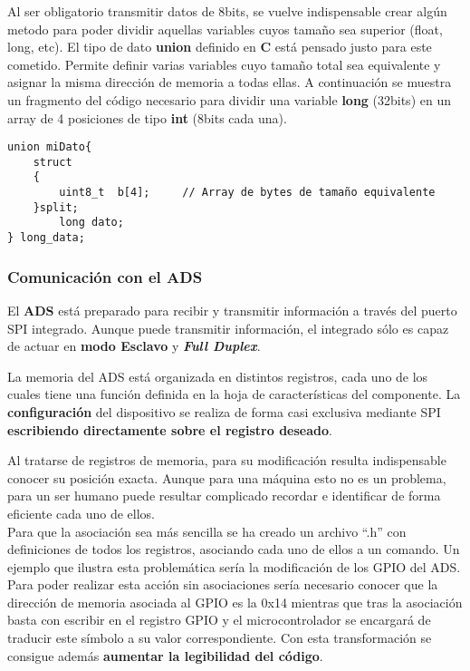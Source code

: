 Al ser obligatorio transmitir datos de 8bits, se vuelve indispensable crear algún metodo para poder dividir aquellas variables cuyos tamaño sea superior (float, long, etc).
El tipo de dato \textbf{union} definido en \textbf{C} está pensado justo para este cometido. Permite definir varias variables cuyo tamaño total sea equivalente y asignar la misma dirección de memoria a todas ellas. A continuación se muestra un fragmento del código necesario para dividir una variable \textbf{long} (32bits) en un array de 4 posiciones de tipo \textbf{int} (8bits cada una).

\begin{lstlisting}[label=algoritmo:STM_Divisor,style = STM-code,frame=single,caption=División de variables en otras de menor tamaño]
union miDato{
	struct
	{
		uint8_t  b[4];     // Array de bytes de tamaño equivalente
	}split;
		long dato;
} long_data; 
\end{lstlisting}
\clearpage

\subsubsection{Comunicación con el ADS \label{sec:Software_micro_ADS}}

El \textbf{ADS} está preparado para recibir y transmitir información a través del puerto SPI integrado. Aunque puede transmitir información, el integrado sólo es capaz de actuar en \textbf{modo Esclavo} y \textbf{\textit{\gls{Full Duplex}}}.

La memoria del ADS está organizada en distintos registros, cada uno de los cuales tiene una función definida en la hoja de características del componente. La \textbf{configuración} del dispositivo se realiza de forma casi exclusiva mediante SPI \textbf{escribiendo directamente sobre el registro deseado}.

Al tratarse de registros de memoria, para su modificación resulta indispensable conocer su posición exacta. Aunque para una máquina esto no es un problema, para un ser humano puede resultar complicado recordar e identificar de forma eficiente cada uno de ellos. 
\\Para que la asociación sea más sencilla se ha creado un archivo ``.h'' con definiciones de todos los registros, asociando cada uno de ellos a un comando. Un ejemplo que ilustra esta problemática sería la modificación de los GPIO del ADS. Para poder realizar esta acción sin asociaciones sería necesario conocer que la dirección de memoria asociada al GPIO es la 0x14 mientras que tras la asociación basta con escribir en el registro \textsc{GPIO} y el microcontrolador se encargará de traducir este símbolo a su valor correspondiente. Con esta transformación se consigue además \textbf{aumentar la legibilidad del código}.

